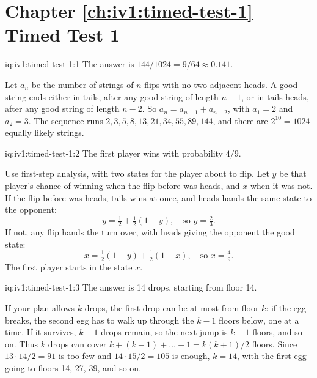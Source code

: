 \section*{Chapter \ref{ch:iv1:timed-test-1} --- Timed Test 1}

\begin{solution}{iq:iv1:timed-test-1:1}
The answer is $144/1024 = 9/64 \approx 0.141$.

Let $a_n$ be the number of strings of $n$ flips with no two adjacent heads. A good string ends either in tails, after any good string of length $n - 1$, or in tails-heads, after any good string of length $n - 2$. So $a_n = a_{n-1} + a_{n-2}$, with $a_1 = 2$ and $a_2 = 3$. The sequence runs $2, 3, 5, 8, 13, 21, 34, 55, 89, 144$, and there are $2^{10} = 1024$ equally likely strings.

\end{solution}

\begin{solution}{iq:iv1:timed-test-1:2}
The first player wins with probability $4/9$.

Use first-step analysis, with two states for the player about to flip. Let $y$ be that player's chance of winning when the flip before was heads, and $x$ when it was not. If the flip before was heads, tails wins at once, and heads hands the same state to the opponent:
\[
y = \tfrac12 + \tfrac12(1 - y), \quad\text{so } y = \tfrac23.
\]
If not, any flip hands the turn over, with heads giving the opponent the good state:
\[
x = \tfrac12(1 - y) + \tfrac12(1 - x), \quad\text{so } x = \tfrac49.
\]
The first player starts in the state $x$.

\end{solution}

\begin{solution}{iq:iv1:timed-test-1:3}
The answer is 14 drops, starting from floor 14.

If your plan allows $k$ drops, the first drop can be at most from floor $k$: if the egg breaks, the second egg has to walk up through the $k - 1$ floors below, one at a time. If it survives, $k - 1$ drops remain, so the next jump is $k - 1$ floors, and so on. Thus $k$ drops can cover $k + (k - 1) + \dots + 1 = k(k + 1)/2$ floors. Since $13 \cdot 14/2 = 91$ is too few and $14 \cdot 15/2 = 105$ is enough, $k = 14$, with the first egg going to floors 14, 27, 39, and so on.

\end{solution}

